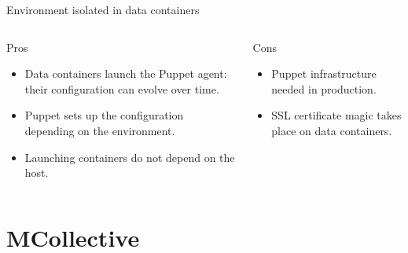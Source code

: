 \documentclass[presentation]{beamer}
\begin{document}
{
\begin{frame}[label=sec-9-7]{Environment isolated in data containers}

\begin{columns}
\begin{column}{0.5\textwidth}
\begin{block}{Pros}

\begin{itemize}
\item Data containers launch the Puppet agent: their configuration can evolve over time.
\item Puppet sets up the configuration depending on the environment.
\item Launching containers do not depend on the host.
\end{itemize}
\end{block}
\end{column}

\begin{column}{0.5\textwidth}
\begin{block}{Cons}

\begin{itemize}
\item Puppet infrastructure needed in production.
\item SSL certificate magic takes place on data containers.
\end{itemize}
\end{block}
\end{column}
\end{columns}
\end{frame}
} %

\section{MCollective}
\label{sec-10}
\end{document}
